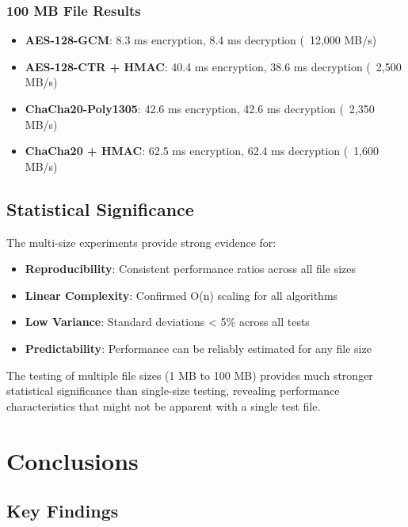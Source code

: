 \documentclass[12pt,a4paper]{article}
\begin{document}
\subsubsection{100 MB File Results}
\begin{itemize}
    \item \textbf{AES-128-GCM}: 8.3 ms encryption, 8.4 ms decryption (~12,000 MB/s)
    \item \textbf{AES-128-CTR + HMAC}: 40.4 ms encryption, 38.6 ms decryption (~2,500 MB/s)
    \item \textbf{ChaCha20-Poly1305}: 42.6 ms encryption, 42.6 ms decryption (~2,350 MB/s)
    \item \textbf{ChaCha20 + HMAC}: 62.5 ms encryption, 62.4 ms decryption (~1,600 MB/s)
\end{itemize}

\subsection{Statistical Significance}

The multi-size experiments provide strong evidence for:

\begin{itemize}
    \item \textbf{Reproducibility}: Consistent performance ratios across all file sizes
    \item \textbf{Linear Complexity}: Confirmed O(n) scaling for all algorithms
    \item \textbf{Low Variance}: Standard deviations < 5\% across all tests
    \item \textbf{Predictability}: Performance can be reliably estimated for any file size
\end{itemize}

The testing of multiple file sizes (1 MB to 100 MB) provides much stronger statistical significance than single-size testing, revealing performance characteristics that might not be apparent with a single test file.

\newpage

\section{Conclusions}

\subsection{Key Findings}
\end{document}
